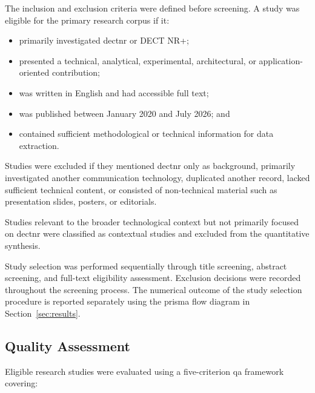 The inclusion and exclusion criteria were defined before screening. A study
was eligible for the primary research corpus if it:

\begin{itemize}

    \item primarily investigated \gls{dectnr} or DECT NR+;

    \item presented a technical, analytical, experimental, architectural, or
    application-oriented contribution;

    \item was written in English and had accessible full text;

    \item was published between January 2020 and July 2026; and

    \item contained sufficient methodological or technical information for
    data extraction.

\end{itemize}

Studies were excluded if they mentioned \gls{dectnr} only as background,
primarily investigated another communication technology, duplicated another
record, lacked sufficient technical content, or consisted of non-technical
material such as presentation slides, posters, or editorials.

Studies relevant to the broader technological context but not primarily
focused on \gls{dectnr} were classified as contextual studies and excluded
from the quantitative synthesis.

Study selection was performed sequentially through title screening, abstract
screening, and full-text eligibility assessment. Exclusion decisions were
recorded throughout the screening process. The numerical outcome of the study
selection procedure is reported separately using the \gls{prisma} flow
diagram in Section~\ref{sec:results}.

\subsection{Quality Assessment}
\label{subsec:quality_assessment}

Eligible research studies were evaluated using a five-criterion \gls{qa}
framework covering:

